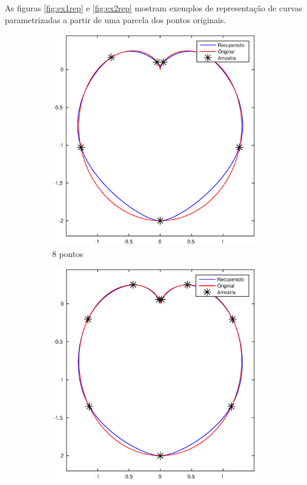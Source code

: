 As figuras \ref{fig:ex1rep} e \ref{fig:ex2rep} mostram exemplos de representação de curvas parametrizadas a partir de uma parcela dos pontos originais.

\begin{figure}[htb]
	\centering
	\begin{subfigure}[b]{0.43\textwidth}
		\centering
		\includegraphics[width=\textwidth]{imagens/cap4/rep_1_8.eps}
		\caption{8 pontos}
		\label{fig:ex11}
	\end{subfigure}
	\hfill
	\begin{subfigure}[b]{0.43\textwidth}
		\centering
		\includegraphics[width=\textwidth]{imagens/cap4/rep_1_10.eps}

\end{subfigure}
\end{figure}
